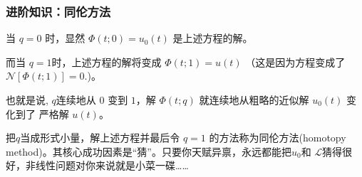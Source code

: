 \documentclass[CJK]{beamer}
\begin{document}
\begin{frame}
  \frametitle{进阶知识：同伦方法}
  当 $q=0$ 时，显然 $\Phi(t;0)= u_0(t)$ 是上述方程的解。

  而当 $q=1$时，上述方程的解将变成 $\Phi(t;1) = u(t)$ （这是因为方程变成了 $\mathcal{N}\left[\Phi(t;1)\right] = 0.$)。

    \skipline

    也就是说, $q$连续地从 $0$ 变到 $1$，解 $\Phi(t;q)$ 就连续地从粗略的近似解 $u_0(t)$ 变化到了 严格解 $u(t)$。

    \skipline
    
    把$q$当成形式小量，解上述方程并最后令 $q=1$ 的方法称为同伦方法(homotopy method)。其核心成功因素是“猜”。只要你天赋异禀，永远都能把$u_0$和 $\mathcal{L}$猜得很好，非线性问题对你来说就是小菜一碟……
  
\end{frame}


\ech
\end{document}
